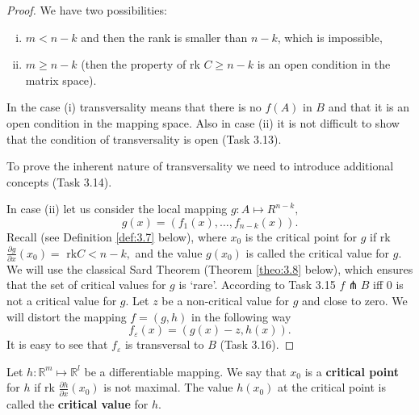 \begin{theorem}
\begin{proof}
		We have two possibilities:
		\begin{enumerate}[(i)]
			\item $m<n-k$ and then the rank is smaller than $n-k$, which is impossible,
			\item $m\geq n-k$ (then the property of \textrm{rk} $C\geq n-k$ is an open condition in the matrix space).
		\end{enumerate}
	In the case (i) transversality means that there is no $f (A)$ in $B$ and that it is an open condition in the mapping space. Also in case (ii) it is not difficult to show that the condition of transversality is open (Task 3.13).
	
	To prove the inherent nature of transversality we need to introduce additional concepts (Task 3.14).
	
	In case (ii) let us consider the local mapping $g:A\longmapsto R^{n-k},$%
	$$
	g(x)=(f_{1}(x),\ldots ,f_{n-k}(x)).
	$$	
	Recall (see Definition \ref{def:3.7} below), where $x_0$ is the critical point for $g$ if rk$\frac{\partial g}{\partial x}(x_{0}) = $ rk$C<n-k,$ and the value $g (x_0)$ is called the critical value for $g$. We will use the classical Sard Theorem (Theorem \ref{theo:3.8} below), which ensures that the set of critical values for $g$ is `rare'. According to Task 3.15 $f\pitchfork B$ iff 0 is not a critical value for $g$. Let $z$ be a non-critical value for $g$ and close to zero. We will distort the mapping $f=(g,h)$ in the following way
	$$
	f_{\varepsilon }(x)=(g(x)-z,h(x)).
	$$
	It is easy to see that $f_{\varepsilon }$ is transversal to $B$ (Task 3.16).
	\end{proof}
\end{theorem}

\begin{definition}\label{def:3.7}
	Let $h:\mathbb{R}^{m}\longmapsto \mathbb{R}^{l}$ be a differentiable mapping. We say that $x_0$ is a \textbf{critical point} for $h$ if rk $\frac{\partial h}{\partial x}(x_{0})$ is not maximal. The value $h(x_0)$ at the critical point is called the \textbf{critical value} for $h$.
\end{definition}

